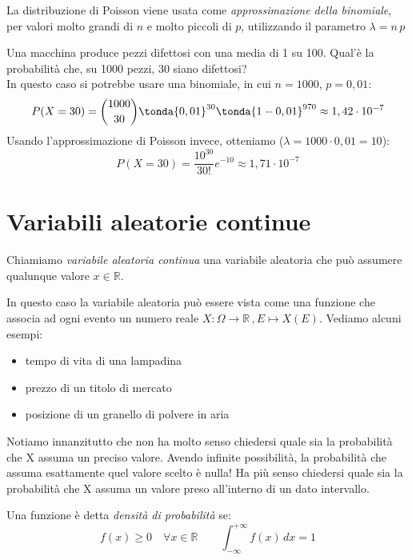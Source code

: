\begin{osservazione} La distribuzione di Poisson viene usata come \emph{approssimazione della binomiale}, per valori molto grandi di $n$ e molto piccoli di $p$, utilizzando il parametro $\lambda = n\,p$
\end{osservazione}

\begin{esempio}
Una macchina produce pezzi difettosi con una media di 1 su 100. Qual'è la probabilità che, su 1000 pezzi, 30 siano difettosi?\\[5pt]
In questo caso si potrebbe usare una binomiale, in cui $n=1000$, $p=0,01$:
\[P(X=30) = \binom{1000}{30} \tonda{0,01}^{30} \tonda{1-0,01}^{970} \approx 1,42\cdot 10^{-7} \]
Usando l'approssimazione di Poisson invece, otteniamo ($\lambda=1000\cdot 0,01=10$):
\[P(X=30) = \dfrac{10^{30}}{30!} e^{-10} \approx 1,71\cdot 10^{-7} \]
\end{esempio}


\section{Variabili aleatorie continue}
\label{sec:continue}

\begin{definizione} Chiamiamo \emph{variabile aleatoria continua} una variabile aleatoria che può assumere qualunque valore $x \in \mathbb{R}$.
\end{definizione}

In questo caso la variabile aleatoria può essere vista come una funzione che associa ad ogni evento un numero reale $X:\Omega \longrightarrow \mathbb{R}\,, E \longmapsto X(E) $. Vediamo alcuni esempi:
\begin{itemize}
\item tempo di vita di una lampadina
\item prezzo di un titolo di mercato
\item  posizione di un granello di polvere in aria
\end{itemize}

Notiamo innanzitutto che non ha molto senso chiedersi quale sia la probabilità che X assuma un preciso valore. Avendo infinite possibilità, la probabilità che assuma esattamente quel valore scelto è nulla! Ha più senso chiedersi quale sia la probabilità che X assuma un valore preso all'interno di un dato intervallo.

\begin{definizione} Una funzione è detta \emph{densità di probabilità} se:
\[ \boxed{f(x) \geq 0 \quad \forall x \in \mathbb{R}} \qquad \boxed{ \int_{-\infty}^{+\infty} f(x)\, dx = 1}\]
\end{definizione}

